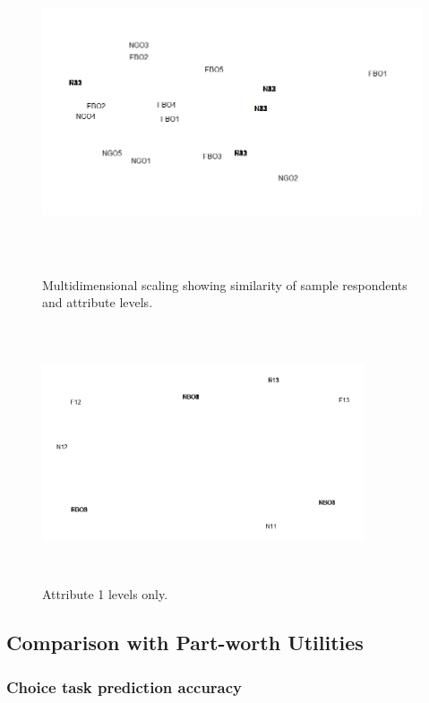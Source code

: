 \documentclass[a4paper, 12pt]{article}
\begin{document}
\begin{figure}[!htpb]
	\centering
	\includegraphics[width=4.5in, height=3.75in]{ACBCout.png}
	\caption{Multidimensional scaling showing similarity of sample respondents and attribute levels.}
	\label{MDSout1}
\end{figure}

\begin{figure}[!htpb]
	\centering
	\includegraphics[width=3.75in, height=3in]{ACBCout2.png}
	\caption{Attribute 1 levels only.}
	\label{MDSout2}
\end{figure}



\newpage
\subsection{Comparison with Part-worth Utilities}

\subsubsection{Choice task prediction accuracy}
\end{document}
